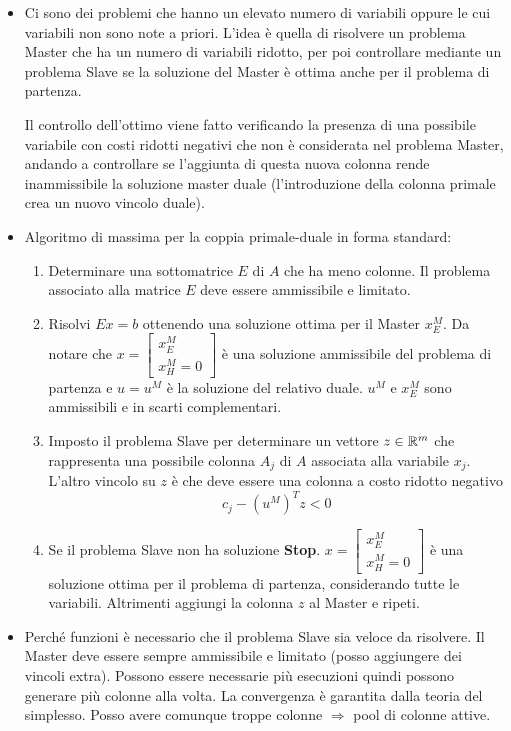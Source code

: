 \begin{itemize}
	\item Ci sono dei problemi che hanno un elevato numero di variabili oppure le cui variabili non sono note a priori. L'idea è quella di risolvere un problema Master che ha un numero di variabili ridotto, per poi controllare mediante un problema Slave se la soluzione del Master è ottima anche per il problema di partenza.
	
	Il controllo dell'ottimo viene fatto verificando la presenza di una possibile variabile con costi ridotti negativi che non è considerata nel problema Master, andando a controllare se l'aggiunta di questa nuova colonna rende inammissibile la soluzione master duale (l'introduzione della colonna primale crea un nuovo vincolo duale).
	
	\item Algoritmo di massima per la coppia primale-duale in forma standard:
	\begin{enumerate}
		\item Determinare una sottomatrice $E$ di $A$ che ha meno colonne. Il problema associato alla matrice $E$ deve essere ammissibile e limitato.
		\item Risolvi $Ex = b$ ottenendo una soluzione ottima per il Master $x_{E}^M$. Da notare che $x = \begin{bmatrix} x_{E}^M \\
		x_{H}^M = 0
		\end{bmatrix}$ è una soluzione ammissibile del problema di partenza e $u = u^M$ è la soluzione del relativo duale. $u^M$ e $x_{E}^M$ sono ammissibili e in scarti complementari.
		\item Imposto il problema Slave per determinare un vettore $z \in \mathbb{R}^m$ che rappresenta una possibile colonna $A_j$ di $A$ associata alla variabile $x_j$. L'altro vincolo su $z$ è che deve essere una colonna a costo ridotto negativo
		$$
		c_j - (u^M)^T z < 0
		$$
		\item Se il problema Slave non ha soluzione \textbf{Stop}. $x = \begin{bmatrix} x_{E}^M \\
		x_{H}^M = 0
		\end{bmatrix}$ è una soluzione ottima per il problema di partenza, considerando tutte le variabili. Altrimenti aggiungi la colonna $z$ al Master e ripeti.
	\end{enumerate}
	\item Perché funzioni è necessario che il problema Slave sia veloce da risolvere. Il Master deve essere sempre ammissibile e limitato (posso aggiungere dei vincoli extra). Possono essere necessarie più esecuzioni quindi possono generare più colonne alla volta. La convergenza è garantita dalla teoria del simplesso. Posso avere comunque troppe colonne $\Rightarrow$ pool di colonne attive.

\end{itemize}
